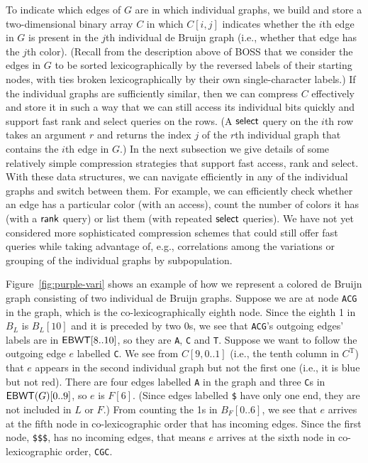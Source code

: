 To indicate which edges of $G$ are in which individual graphs, we build and store a two-dimensional binary array $C$ in which \(C [i, j]\) indicates whether the $i$th edge in $G$ is present in the $j$th individual de Bruijn graph (i.e., whether that edge has the $j$th color).
(Recall from the description above of BOSS that we consider the edges in $G$ to be sorted lexicographically by the reversed labels of their starting nodes, with ties broken lexicographically by their own single-character labels.)
If the individual graphs are sufficiently similar, then we can compress $C$ effectively and store it in such a way that we can still access its individual bits quickly and support fast rank and select queries on the rows.  (A $\textsf{select}$ query on the $i$th row takes an argument $r$ and returns the index $j$ of the $r$th individual graph that contains the $i$th edge in $G$.)  In the next subsection we give details of some relatively simple compression strategies that support fast access, rank and select.  With these data structures, we can navigate efficiently in any of the individual graphs and switch between them.  For example, we can efficiently check whether an edge has a particular color (with an access), count the number of colors it has (with a $\textsf{rank}$ query) or list them (with repeated $\textsf{select}$ queries).  We have not yet considered more sophisticated compression schemes that could still offer fast queries while taking advantage of, e.g., correlations among the variations or grouping of the individual graphs by subpopulation.

Figure~\ref{fig:purple-vari} shows an example of how we represent a colored de Bruijn graph consisting of two individual de Bruijn graphs.  Suppose we are at node \texttt{ACG} in the graph, which is the co-lexicographically eighth node.  Since the eighth 1 in $B_L$ is \(B_L [10]\) and it is preceded by two 0s, we see that \texttt{ACG}'s outgoing edges' labels are in \(\mathsf{EBWT} [8..10]\), so they are \texttt{A}, \texttt{C} and \texttt{T}.  Suppose we want to follow the outgoing edge $e$ labelled \texttt{C}.  We see from \(C [9, 0..1]\) (i.e., the tenth column in $C^\mathrm{T}$) that $e$ appears in the second individual graph but not the first one (i.e., it is blue but not red).    There are four edges labelled \texttt{A} in the graph and three \texttt{C}s in \(\mathsf{EBWT} (G) [0..9]\), so $e$ is \(F [6]\).  (Since edges labelled \texttt{\$} have only one end, they are not included in $L$ or $F$.)  From counting the 1s in \(B_F [0..6]\), we see that $e$ arrives at the fifth node in co-lexicographic order that has incoming edges.  Since the first node, \texttt{\$\$\$}, has no incoming edges, that means $e$ arrives at the sixth node in co-lexicographic order, \texttt{CGC}.

